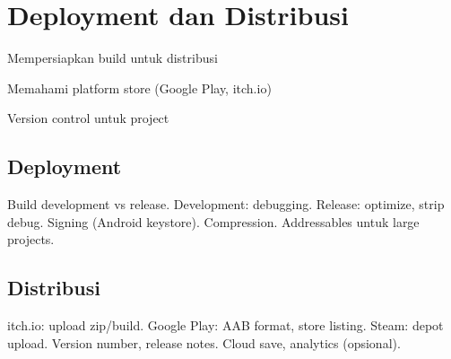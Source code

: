 \section{Deployment dan Distribusi}

\begin{learningoutcomes}
\item Mempersiapkan build untuk distribusi
\item Memahami platform store (Google Play, itch.io)
\item Version control untuk project
\end{learningoutcomes}

\subsection{Deployment}

Build development vs release. Development: debugging. Release: optimize, strip debug. Signing (Android keystore). Compression. Addressables untuk large projects.

\subsection{Distribusi}

itch.io: upload zip/build. Google Play: AAB format, store listing. Steam: depot upload. Version number, release notes. Cloud save, analytics (opsional).
